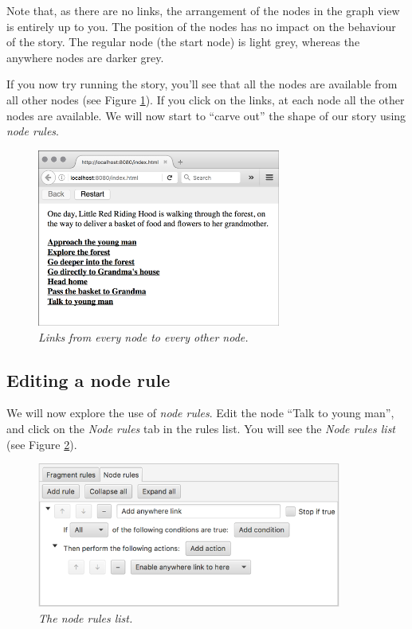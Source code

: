 \documentclass{article}
\begin{document}
Note that, as there are no links, the arrangement of the nodes in the graph view is entirely up to you. The position of the nodes has no impact on the behaviour of the story. The regular node (the start node) is light grey, whereas the anywhere nodes are darker grey.

If you now try running the story, you'll see that all the nodes are available from all other nodes (see Figure \ref{fig:tut3:running_start}). If you click on the links, at each node all the other nodes are available. We will now start to ``carve out'' the shape of our story using \textit{node rules}.

\begin{figure}[h]
  \centering
  \includegraphics[width=8cm]{images/hypedyn-tutorial-3-figure-3}
  \caption{\textit{Links from every node to every other node.}}
  \label{fig:tut3:running_start}
\end{figure} 

\subsection{Editing a node rule}

We will now explore the use of \textit{node rules}. Edit the node ``Talk to young man'', and click on the \textit{Node rules} tab in the rules list. You will see the \textit{Node rules list} (see Figure \ref{fig:tut3:edit_node_rules}).

\begin{figure}[h]
  \centering
  \includegraphics[width=10cm]{images/hypedyn-tutorial-3-figure-4}
  \caption{\textit{The node rules list.}}
  \label{fig:tut3:edit_node_rules}
\end{figure} 
\end{document}
